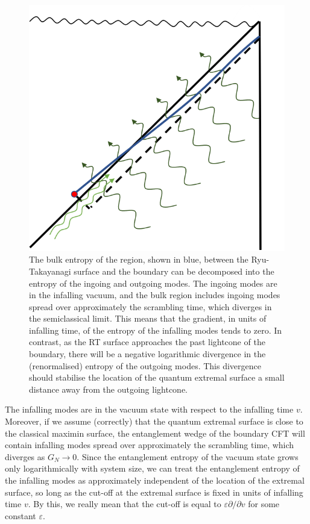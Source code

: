 \documentclass[12pt]{article}
\begin{document}
\begin{figure}[t]
\includegraphics[width = 0.5\linewidth]{Cauchy.png}
\centering
\caption{The bulk entropy of the region, shown in blue, between the Ryu-Takayanagi surface and the boundary can be decomposed into the entropy of the ingoing and outgoing modes. The ingoing modes are in the infalling vacuum, and the bulk region includes ingoing modes spread over approximately the scrambling time, which diverges in the semiclassical limit. This means that the gradient, in units of infalling time, of the entropy of the infalling modes tends to zero. In contrast, as the RT surface approaches the past lightcone of the boundary, there will be a negative logarithmic divergence in the (renormalised) entropy of the outgoing modes. This divergence should stabilise the location of the quantum extremal surface a small distance away from the outgoing lightcone.}
\label{fig:cauchy}
\end{figure}

The infalling modes are in the vacuum state with respect to the infalling time $v$. Moreover, if we assume (correctly) that the quantum extremal surface is close to the classical maximin surface, the entanglement wedge of the boundary CFT will contain infalling modes spread over approximately the scrambling time, which diverges as $G_N \to 0$. Since the entanglement entropy of the vacuum state grows only logarithmically with system size, we can treat the entanglement entropy of the infalling modes as approximately independent of the location of the extremal surface, so long as  the cut-off at the extremal surface is fixed in units of infalling time $v$. By this, we really mean that the cut-off is equal to $\varepsilon \partial/ \partial v$ for some constant $\varepsilon$.
\end{document}
